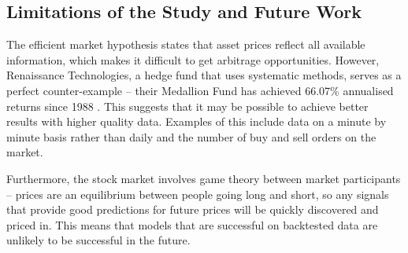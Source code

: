 \documentclass[a4paper, 11pt]{article}
\begin{document}
\subsection{Limitations of the Study and Future Work}
The efficient market hypothesis states that asset prices reflect all available information, which makes it difficult to get arbitrage opportunities. However, Renaissance Technologies, a hedge fund that uses systematic methods, serves as a perfect counter-example -- their Medallion Fund has achieved 66.07\% annualised returns since 1988 \cite{cornell2020medallion}. This suggests that it may be possible to achieve better results with higher quality data. Examples of this include data on a minute by minute basis rather than daily and the number of buy and sell orders on the market.

Furthermore, the stock market involves game theory between market participants -- prices are an equilibrium between people going long and short, so any signals that provide good predictions for future prices will be quickly discovered and priced in. This means that models that are successful on backtested data are unlikely to be successful in the future.



\end{document}
